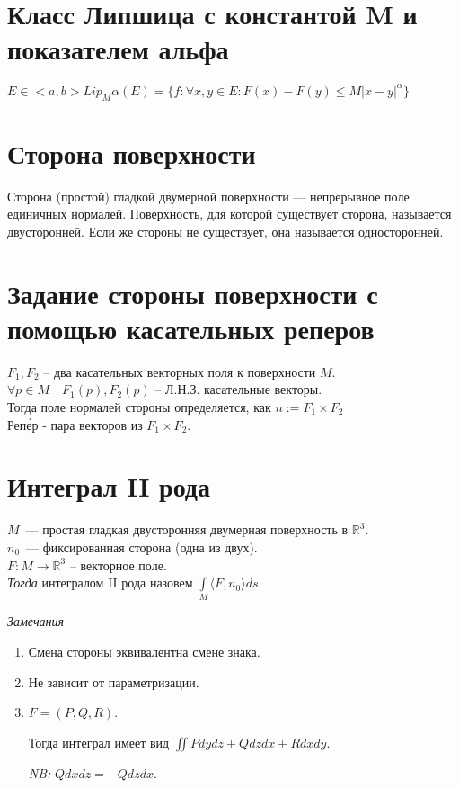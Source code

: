 \documentclass[paper=a4, fontsize=14pt]{report}
\begin{document}
    \section{Класс Липшица с константой M и показателем альфа}
    $E \in <a, b>   Lip_M \alpha(E) = \{f: \forall x,y \in E : F(x) - F(y) \leq M|x-y|^\alpha\}$

	\section{Сторона поверхности}

	Сторона (простой) гладкой двумерной поверхности {{---}} непрерывное поле единичных нормалей. Поверхность, для которой существует сторона, называется двусторонней. Если же стороны не существует, она называется односторонней.


	\section{Задание стороны поверхности с помощью касательных реперов}

	$F_1, F_2$ -- два касательных векторных поля к поверхности $M$.\\
	$\forall p \in M \quad F_1(p), F_2(p)$ -- Л.Н.З. касательные векторы.\\
	Тогда поле нормалей стороны определяется, как $n := F_1 \times F_2$\\

	Реп\'{е}р - пара векторов из $F_1 \times F_2$.

	\section{Интеграл II рода}

	$M$~--- простая гладкая двусторонняя двумерная поверхность в $\mathds{R}^3$.\\
	$n_0$~--- фиксированная сторона (одна из двух).\\
	$F : M \rightarrow \mathbb{R}^3$ -- векторное поле.\\

	\emph{Тогда} интегралом II рода назовем $\int\limits_{M} \langle F, n_0 \rangle ds$

	\emph{Замечания}
	\begin{enumerate}
		\item Смена стороны эквивалентна смене знака.
		\item Не зависит от параметризации.
		\item
		$F=(P, Q, R)$.

		Тогда интеграл имеет вид $\iint P dydz + Q dzdx + R dxdy$.

		\emph{NB:} $Q dxdz = -Q dzdx$.
	\end{enumerate}
\end{document}

